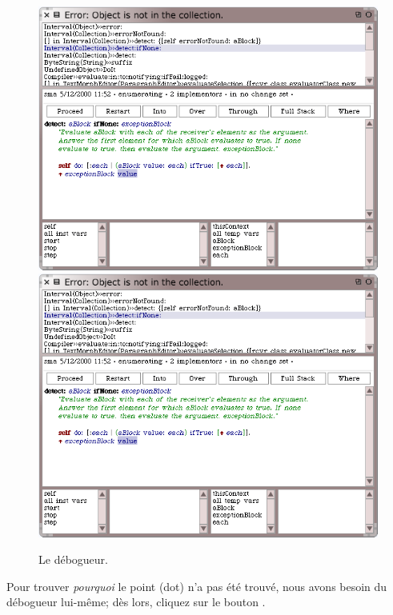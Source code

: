 \documentclass[a4paper,10pt,twoside]{book}
\begin{document}
\begin{figure}[btp]
	\begin{center}
	\ifluluelse
		{\includegraphics[width=\textwidth]{debuggerDetectIfNone}}
		{\includegraphics[scale=0.7]{debuggerDetectIfNone}}
	\end{center}
	\caption{Le d\'ebogueur.}
	\label{fig:debuggerDetectIfNone}
\end{figure}

Pour trouver \emph{pourquoi} le point (dot) n'a pas \'et\'e trouv\'e,
nous avons besoin du d\'ebogueur lui-m\^eme; d\`es lors, cliquez sur
le bouton .

\end{document}

